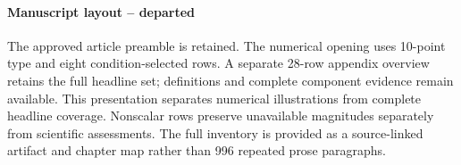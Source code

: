 \documentclass[11pt]{article}
\begin{document}
\paragraph{Manuscript layout -- departed}
The approved article preamble is retained. The numerical opening uses 10-point type and eight condition-selected rows. A separate 28-row appendix overview retains the full headline set; definitions and complete component evidence remain available. This presentation separates numerical illustrations from complete headline coverage. Nonscalar rows preserve unavailable magnitudes separately from scientific assessments. The full inventory is provided as a source-linked artifact and chapter map rather than 996 repeated prose paragraphs.


\end{document}
